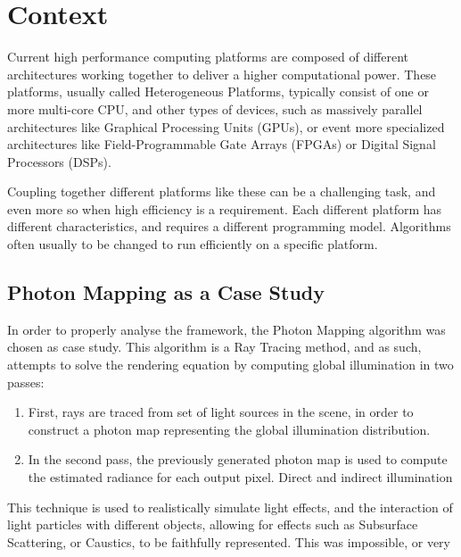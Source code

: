 \section{Context}

Current high performance computing platforms are composed of different architectures working together to deliver a higher computational power. These platforms, usually called Heterogeneous Platforms, typically consist of one or more multi-core CPU, and other types of devices, such as massively parallel architectures like Graphical Processing Units (GPUs), or event more specialized architectures like Field-Programmable Gate Arrays (FPGAs) or Digital Signal Processors (DSPs).

Coupling together different platforms like these can be a challenging task, and even more so when high efficiency is a requirement. Each different platform has different characteristics, and requires a different programming model. Algorithms often usually to be changed to run efficiently on a specific platform.

\subsection{Photon Mapping as a Case Study}

In order to properly analyse the \GAMA framework, the Photon Mapping algorithm was chosen as case study. This algorithm is a Ray Tracing method, and as such, attempts to solve the rendering equation \cite{kajiya1986rendering} by computing global illumination in two passes:

\begin{enumerate}
  \item First, rays are traced from set of light sources in the scene, in order to construct a photon map representing the global illumination distribution.
  \item In the second pass, the previously generated photon map is used to compute the estimated radiance for each output pixel. Direct and indirect illumination
\end{enumerate}

This technique is used to realistically simulate light effects, and the interaction of light particles with different objects, allowing for effects such as Subsurface Scattering, or Caustics, to be faithfully represented. This was impossible, or very 
